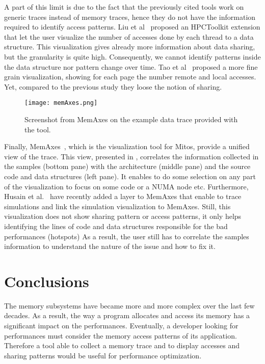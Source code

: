 A part of this limit is due to the fact that the previously cited tools work on generic traces instead of memory traces, hence they do not have the information required to identify access patterns.
Liu et al~\cite{Liu13Datacentric,Liu14Tool} proposed an \gls{HPCToolkit} extension that let the user visualize the number of accesses done by each thread to a data structure.
This visualization gives already more information about data sharing, but the granularity is quite high.
Consequently, we cannot identify patterns inside the data structure nor pattern change over time.
Tao et al~\cite{Tao01Visualizing} proposed a more fine grain  visualization, showing for each page the number remote and local accesses.
Yet, compared to the previous study they loose the notion of sharing.

\begin{figure}[htb]
    \centering
    \texttt{[image: memAxes.png]}
    \caption[Screenshot from MemAxes.]{Screenshot from MemAxes on the example data trace provided with the
    tool.}
    \label{fig:memaxes}
\end{figure}

Finally, \gls{MemAxes}~\cite{Gimenez14Dissecting}, which is the visualization tool for \gls{Mitos}, provide a unified view of the trace.
This view, presented in , correlates the information collected in the samples (bottom pane) with the architecture (middle pane) and the source code and data structures (left pane).
It enables to do some selection on any part of the visualization to focus on some code or a NUMA node etc.
Furthermore, Husain et al.~\cite{Husain15Relating} have recently added a layer to \gls{MemAxes} that enable to trace simulations and link the simulation visualization to \gls{MemAxes}.
Still, this visualization does not show sharing pattern or access patterns, it only helps identifying the lines of code and data structures responsible for the bad performances (hotspots)
As a result, the user still has to correlate the samples information to understand the nature of the issue and how to fix it.

\section{Conclusions}
\label{sec:mem-cncl}

The memory subsystems have became more and more complex over the last few decades.
As a result, the way a program allocates and access its memory has a significant impact on the performances.
Eventually, a developer looking for performances must consider the memory access patterns of its application.
Therefore a tool able to collect a memory trace and to display accesses and sharing patterns would be useful for performance optimization.


